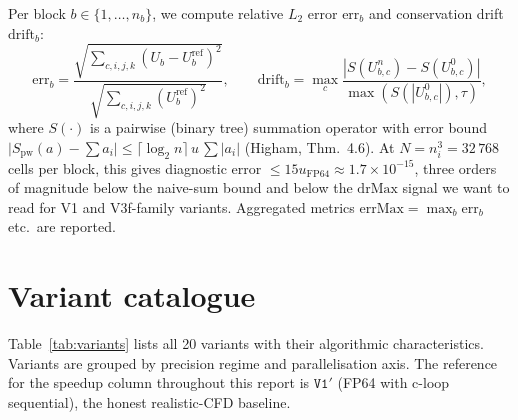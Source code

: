 \documentclass[11pt,a4paper]{article}
\begin{document}
Per block \(b \in \{1,\dots,n_b\}\), we compute relative \(L_2\) error
\(\mathrm{err}_b\) and conservation drift \(\mathrm{drift}_b\):
\begin{equation}
\mathrm{err}_b =
\frac{\sqrt{\sum_{c,i,j,k} (U_b - U^{\mathrm{ref}}_b)^2}}
     {\sqrt{\sum_{c,i,j,k} (U^{\mathrm{ref}}_b)^2}},
\qquad
\mathrm{drift}_b =
\max_c \frac{|S(U^n_{b,c}) - S(U^0_{b,c})|}{\max(S(|U^0_{b,c}|), \tau)},
\end{equation}
where \(S(\cdot)\) is a pairwise (binary tree) summation operator
with error bound
\(\bigl|S_{\mathrm{pw}}(a) - \sum a_i\bigr| \le \lceil \log_2 n\rceil\,u\,\sum|a_i|\)
(Higham, Thm.~4.6). At \(N = n_i^3 = 32{\,}768\) cells per block, this
gives diagnostic error \(\le 15 u_{\mathrm{FP64}} \approx 1.7\times 10^{-15}\),
three orders of magnitude below the naive-sum bound and below the
\(\mathrm{drMax}\) signal we want to read for V1 and V3f-family
variants. Aggregated metrics
\(\mathrm{errMax} = \max_b \mathrm{err}_b\) etc.\ are reported.

\section{Variant catalogue}
\label{sec:catalogue}

Table~\ref{tab:variants} lists all 20 variants with their algorithmic
characteristics. Variants are grouped by precision regime and
parallelisation axis. The reference for the speedup column
throughout this report is \(\mathtt{V1'}\) (FP64 with c-loop
sequential), the honest realistic-CFD baseline.
\end{document}
